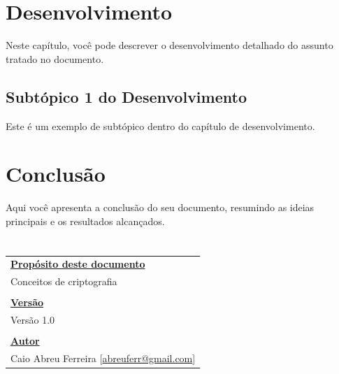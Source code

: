 \documentclass[a4paper,12pt]{report}
\begin{document}
\chapter{Desenvolvimento}
Neste capítulo, você pode descrever o desenvolvimento detalhado do assunto tratado no documento.

\section{Subtópico 1 do Desenvolvimento}
Este é um exemplo de subtópico dentro do capítulo de desenvolvimento.

\clearpage

\chapter{Conclusão}
Aqui você apresenta a conclusão do seu documento, resumindo as ideias principais e os resultados alcançados.

\clearpage

\chapter*{}
\vspace*{\fill}
\begin{flushright}
    \begin{tabular}{l}
    \textbf{\underline{Propósito deste documento}} \\
    Conceitos de criptografia \\
    \\
    \textbf{\underline{Versão}} \\
    Versão 1.0 \\
    \\
    \textbf{\underline{Autor}} \\
    Caio Abreu Ferreira [\href{mailto:abreuferr@gmail.com}{abreuferr@gmail.com}] \\
    \end{tabular}
\end{flushright}
\end{document}
